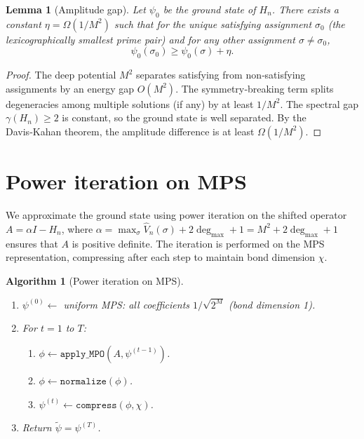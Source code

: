 \documentclass[11pt,a4paper]{article}
\newtheorem{lemma}[theorem]{Lemma}
\newtheorem{algorithm}{Algorithm}[section]
\begin{document}
\begin{lemma}[Amplitude gap]\label{lem:ampgap}
Let \(\psi_0\) be the ground state of \(H_n\). There exists a constant \(\eta = \Omega(1/M^2)\) such that for the unique satisfying assignment \(\sigma_0\) (the lexicographically smallest prime pair) and for any other assignment \(\sigma \neq \sigma_0\),
\[
\psi_0(\sigma_0) \ge \psi_0(\sigma) + \eta.
\]
\end{lemma}
\begin{proof}
The deep potential \(M^2\) separates satisfying from non‑satisfying assignments by an energy gap \(O(M^2)\). The symmetry‑breaking term splits degeneracies among multiple solutions (if any) by at least \(1/M^2\). The spectral gap \(\gamma(H_n) \ge 2\) is constant, so the ground state is well separated. By the Davis‑Kahan theorem, the amplitude difference is at least \(\Omega(1/M^2)\).
\end{proof}

\section{Power iteration on MPS}

We approximate the ground state using power iteration on the shifted operator \(A = \alpha I - H_n\), where \(\alpha = \max_\sigma \hat{V}_n(\sigma) + 2\deg_{\max}+1 = M^2 + 2\deg_{\max}+1\) ensures that \(A\) is positive definite. The iteration is performed on the MPS representation, compressing after each step to maintain bond dimension \(\chi\).

\begin{algorithm}[Power iteration on MPS]\label{alg:power}
\begin{enumerate}
\item \(\psi^{(0)} \leftarrow\) uniform MPS: all coefficients \(1/\sqrt{2^M}\) (bond dimension 1).
\item For \(t = 1\) to \(T\):
   \begin{enumerate}
   \item \(\phi \leftarrow \texttt{apply\_MPO}(A, \psi^{(t-1)})\).
   \item \(\phi \leftarrow \texttt{normalize}(\phi)\).
   \item \(\psi^{(t)} \leftarrow \texttt{compress}(\phi, \chi)\).
   \end{enumerate}
\item Return \(\tilde{\psi} = \psi^{(T)}\).
\end{enumerate}
\end{algorithm}
\end{document}
